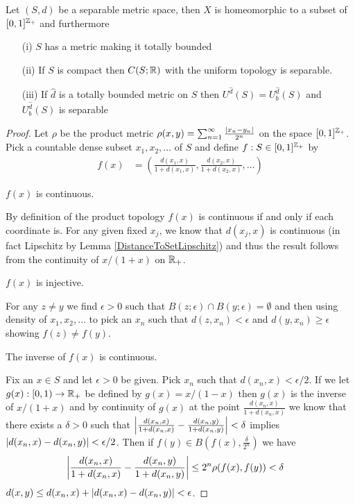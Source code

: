 \begin{lem}\label{SeparabilityOfBoundedUniformlyContinuous}Let $(S,d)$ be a separable metric space, then $X$ is
  homeomorphic to a subset of $[0,1]^{\mathbb{Z}_+}$ and furthermore
\begin{itemize}
\item[(i)]$S$ has a metric making it totally bounded
\item[(ii)]If $S$ is compact then $C(S; \mathbb{R})$ with the uniform
  topology is separable.
\item[(iii)]If $\hat{d}$ is a totally bounded metric on $S$ then $U^{\hat{d}}(S) = U^{\hat{d}}_b(S)$ and 
  $U^{\hat{d}}_b(S)$ is separable
\end{itemize}
\end{lem}
\begin{proof}
Let $\rho$ be the product metric $\rho(x,y) = \sum_{n=1}^\infty
\frac{\left \vert x_n-y_n \right \vert}{2^n}$ on the space $[0,1]^{\mathbb{Z}_+}$. 
 Pick a countable dense subset $x_1, x_2, \dotsc$ of $S$ and define 
$f : S \in [0,1]^{\mathbb{Z}_+}$ by 
\begin{align*}
f(x) &= \left ( \frac{d(x_1, x)}{1 + d(x_1, x)}, \frac{d(x_2, x)}{1 +
    d(x_2, x)}, \dotsc \right )
\end{align*}
 
\begin{clm}$f(x)$ is continuous.
\end{clm}

By definition of the product topology $f(x)$ is continuous if and only
if each coordinate is.  For any given fixed $x_j$, we know that
$d(x_j, x)$ is continuous (in fact Lipschitz by Lemma
\ref{DistanceToSetLipschitz}) and thus the result follows from the
continuity of $x/(1+x)$ on $\mathbb{R}_+$.

\begin{clm}$f(x)$ is injective.
\end{clm}

For any $z \neq y$ we find $\epsilon > 0$ such that $B(z ; \epsilon)
\cap B( y ; \epsilon) = \emptyset$ and then using density of $x_1,
x_2, \dotsc$ to pick an $x_n$ such that $d(z,x_n) < \epsilon$ and
$d(y, x_n) \geq \epsilon$ showing $f(z) \neq f(y)$.  

\begin{clm}The inverse of $f(x)$ is continuous.
\end{clm}

Fix an $x \in S$ and let $\epsilon >0$ be given.  Pick $x_n$ such that
$d(x_n, x) < \epsilon/2$.  If we let $g(x) : [0,1) \to \mathbb{R}_+$ be
defined by $g(x) = x/(1-x)$ then $g(x)$ is the inverse of $x/(1+x)$ 
and by continuity of $g(x)$ at the point $\frac{d(x_n, x)}{1+d(x_n,x)}$ we know that there exists a $\delta > 0$
such that $\left \vert \frac{d(x_n, x)}{1+d(x_n,x)} - 
\frac{d(x_n,  y)}{1+d(x_n,y)} \right \vert< \delta$ implies $\left \vert d(x_n,x) - d(x_n,y) \right \vert <
  \epsilon/2$.
Then if $f(y) \in B(f(x), \frac{\delta}{2^n})$ we have
\begin{align*}
\left \vert \frac{d(x_n, x)}{1+d(x_n,x)} - 
\frac{d(x_n,  y)}{1+d(x_n,y)} \right \vert &\leq 2^n \rho(f(x), f(y)) < \delta
\end{align*}
$d(x,y) \leq d(x_n,x) + \left \vert d(x_n,x) - d(x_n,y) \right \vert < \epsilon$.


\end{proof}
